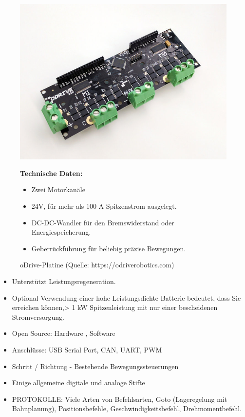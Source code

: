 \begin{figure}[htb]
	\centering
	\begin{minipage}{0.38\linewidth}
		\centering
		\includegraphics[scale=0.2]{images/odrive.jpeg}
		\caption{oDrive-Platine  \newline (Quelle: https://odriverobotics.com)}
		\label{odrive}
	\end{minipage}
 \begin{minipage}[h]{0.6\textwidth}
	\textbf{Technische Daten:}
	\begin{itemize}
		\item Zwei Motorkanäle
		\item 24V, für mehr als 100 A Spitzenstrom ausgelegt.
		\item DC-DC-Wandler für den Bremswiderstand oder Energiespeicherung.
		\item Geberrückführung für beliebig präzise Bewegungen.

	\end{itemize}
\end{minipage}
\end{figure}

\begin{itemize}
\item Unterstützt Leistungsregeneration.
\item Optional Verwendung einer hohe Leistungsdichte Batterie bedeutet, dass Sie erreichen können,> 1 kW Spitzenleistung mit nur einer bescheidenen Stromversorgung.
\item Open Source: Hardware , Software
\item Anschlüsse: USB Serial Port, CAN, UART, PWM
\item Schritt / Richtung - Bestehende Bewegungssteuerungen
\item Einige allgemeine digitale und analoge Stifte
\item PROTOKOLLE: Viele Arten von Befehlsarten,
Goto (Lageregelung mit Bahnplanung),
Positionsbefehle,
Geschwindigkeitsbefehl,
Drehmomentbefehl.
\end{itemize}

